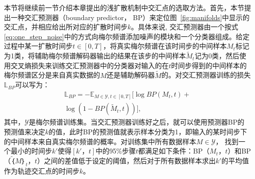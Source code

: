 %
本节将继续前一节介绍本章提出的浅扩散机制中交汇点的选取方法。首先，本节提出一种交汇预测器（boundary predictor， BP）来定位图~\ref{fig:manifolds}中显示的交汇点，并相应给出所对应的扩散时间步$k$。具体来说, 交汇预测器由一个按式\eqref{eq:one_step_noise}中的方式向梅尔频谱添加噪声的模块和一个分类器组成。给定过程中某一扩散时间步$t\in[0, T]$，将真实梅尔频谱在该时间步的中间样本$M_t$标记为1类，将辅助梅尔频谱解码器输出的结果在该步的中间样本$\widetilde{M}_t$记为0类，然后使用交叉熵损失来训练交汇预测器中的分类器对输入的在$t$时间步得到的中间样本的梅尔频谱区分是来自真实数据的$M$还是辅助解码器$\widetilde{M}$的。对交汇预测器训练的损失$\mathbb{L}_{BP}$可以写为：
\begin{align*}
    \mathbb{L}_{BP} = - \mathbb{E}_{M\in\mathcal{Y}, t \in [0, T]} [\log BP(M_t, t) + \\
    \log (1-BP(\widetilde{M}_t, t))],
\end{align*}
其中，$\mathcal{Y}$是梅尔频谱训练集。当交汇预测器训练好之后，就可以使用预测器BP的预测值来决定$k$的值，此时BP的预测值就表示样本分类为1，即输入的某时间步下的中间样本来自真实梅尔频谱的概率。对训练集中所有数据样本$ M \in \mathcal{Y}$，
找到一个最小的时间步$k'$使得$[k'，t]$中的95\%步骤$t$都满足如下条件：BP（$M_t$，$t$）和BP（$\widetilde｛M｝_t$，$t$）之间的差值低于设定的阈值，然后对于所有数据样本求出$k'$的平均值作为轨迹交汇点的时间步$k$。


